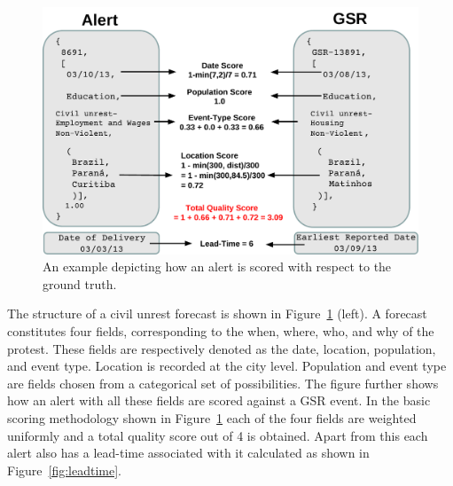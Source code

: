 \begin{figure}
\includegraphics[width=\columnwidth]{figures/cu/alert_vs_gsr.pdf}
\caption{An example depicting how an alert is scored with respect to the ground truth.}
\label{fig:alert}
\end{figure}

The structure of a civil unrest forecast is shown in
Figure~\ref{fig:alert} (left).
A forecast constitutes four fields, corresponding to the when, where, who, and why
of the protest. These fields are respectively denoted as the date, location, population, and event type.
Location is recorded at the city level. Population and event type are fields chosen from a categorical
set of possibilities.  The figure further shows how an alert with all
these fields are scored against a GSR event. In the basic scoring
methodology shown in Figure~\ref{fig:alert} each of the four fields
are weighted uniformly and a total quality score out of 4 is
obtained.  Apart from this each alert also has a lead-time associated with
it calculated as shown in Figure~\ref{fig:leadtime}.

